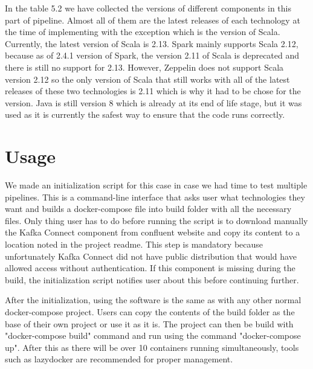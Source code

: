 In the table 5.2 we have collected the versions of different components in this part of pipeline.
Almost all of them are the latest releases of each technology at the time of implementing with the exception which is the version of Scala.
Currently, the latest version of Scala is 2.13.
Spark mainly supports Scala 2.12, because as of 2.4.1 version of Spark, the version 2.11 of Scala is deprecated and there is still no support for 2.13.
However, Zeppelin does not support Scala version 2.12 so the only version of Scala that still works with all of the latest releases of these two technologies is 2.11 which is why it had to be chose for the version.
Java is still version 8 which is already at its end of life stage, but it was used as it is currently the safest way to ensure that the code runs correctly.

\section{Usage}

We made an initialization script for this case in case we had time to test multiple pipelines.
This is a command-line interface that asks user what technologies they want and builds a docker-compose file into build folder with all the necessary files.
Only thing user has to do before running the script is to download manually the Kafka Connect component from confluent website and copy its content to a location noted in the project readme. 
This step is mandatory because unfortunately Kafka Connect did not have public distribution that would have allowed access without authentication.
If this component is missing during the build, the initialization script notifies user about this before continuing further.

After the initialization, using the software is the same as with any other normal docker-compose project.
Users can copy the contents of the build folder as the base of their own project or use it as it is.
The project can then be build with "docker-compose build" command and run using the command "docker-compose up".
After this as there will be over 10 containers running simultaneously, tools such as lazydocker are recommended for proper management.

